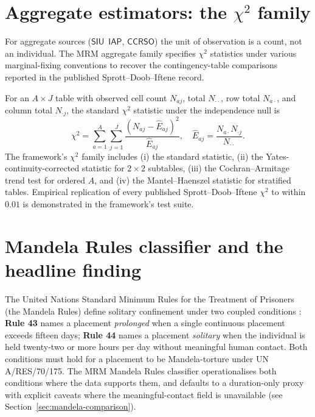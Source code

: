 \documentclass[article,shortnames,nojss]{jss}
\newcommand{\SIU}{\textsf{SIU}}
\newcommand{\CCRSO}{\textsf{CCRSO}}
\newcommand{\IAP}{\textsf{IAP}}
\begin{document}
\section[Aggregate estimators: the chi-squared family]{Aggregate estimators: the $\chi^{2}$ family}
\label{sec:aggregate}

For aggregate sources ($\SIU$~$\IAP$, $\CCRSO$) the unit of
observation is a count, not an individual. The MRM aggregate
family specifies $\chi^{2}$ statistics under various
marginal-fixing conventions to recover the contingency-table
comparisons reported in the published Sprott--Doob--Iftene
record.

For an $A \times J$ table with observed cell count $N_{aj}$, total
$N_{\cdot\cdot}$, row total $N_{a\cdot}$, and column total
$N_{\cdot j}$, the standard $\chi^{2}$ statistic under the
independence null is
\begin{equation}\label{eq:chi-sq}
\chi^{2} = \sum_{a=1}^{A} \sum_{j=1}^{J}
\frac{(N_{aj} - \hat{E}_{aj})^{2}}{\hat{E}_{aj}},
\quad
\hat{E}_{aj} = \frac{N_{a\cdot} N_{\cdot j}}{N_{\cdot\cdot}}.
\end{equation}
The framework's $\chi^{2}$ family includes (i) the standard
statistic, (ii) the Yates-continuity-corrected statistic for
$2\times2$ subtables, (iii) the Cochran--Armitage trend test for
ordered $A$, and (iv) the Mantel--Haenszel statistic
\citep{MantelHaenszel1959} for
stratified tables. Empirical replication of every published
Sprott--Doob--Iftene $\chi^{2}$ to within $0.01$ is demonstrated
in the framework's test suite.

\section{Mandela Rules classifier and the headline finding}
\label{sec:mandela}

The United Nations Standard Minimum Rules for the Treatment of
Prisoners (the Mandela Rules) define solitary confinement under
two coupled conditions \citep{MandelaRules2015}: \textbf{Rule 43}
names a placement \emph{prolonged} when a single continuous
placement exceeds fifteen days; \textbf{Rule 44} names a
placement \emph{solitary} when the individual is held twenty-two
or more hours per day without meaningful human contact.  Both
conditions must hold for a placement to be Mandela-torture under
UN A/RES/70/175.  The MRM Mandela Rules classifier
operationalises both conditions where the data supports them,
and defaults to a duration-only proxy with explicit caveats
where the meaningful-contact field is unavailable (see
Section~\ref{sec:mandela-comparison}).
\end{document}
